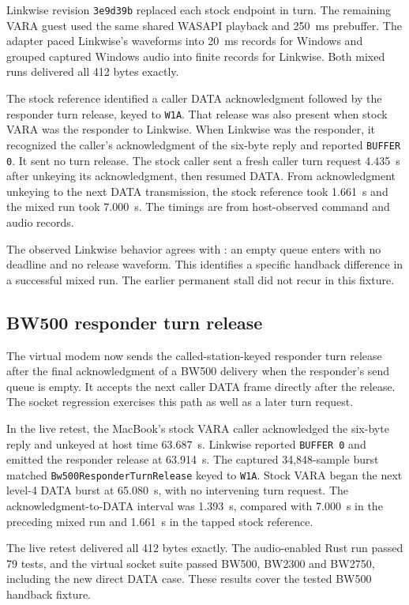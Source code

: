 \documentclass[11pt,a4paper]{article}
\newcommand{\pathtext}[1]{\path{#1}}
\begin{document}
Linkwise revision \texttt{3e9d39b} replaced each stock endpoint in
turn. The remaining VARA guest used the same shared WASAPI
playback and 250~ms prebuffer. The adapter paced Linkwise's
waveforms into 20~ms records for Windows and grouped captured
Windows audio into finite records for Linkwise. Both mixed runs
delivered all 412 bytes exactly.

The stock reference identified a caller DATA acknowledgment
followed by the responder turn release, keyed to \texttt{W1A}.
That release was also present when stock VARA was the responder
to Linkwise. When Linkwise was the responder, it recognized
the caller's acknowledgment of the six-byte reply and reported
\texttt{BUFFER 0}. It sent no turn release. The stock caller
sent a fresh caller turn request 4.435~s after unkeying its
acknowledgment, then resumed DATA. From acknowledgment unkeying
to the next DATA transmission, the stock reference took
1.661~s and the mixed run took 7.000~s. The timings are from
host-observed command and audio records.

The observed Linkwise behavior agrees with
\pathtext{acknowledge_delivery}: an empty queue enters
\pathtext{Phase::Sent} with no deadline and no release waveform.
This identifies a specific handback difference in a successful
mixed run. The earlier permanent stall did not recur in this
fixture.

\subsection{BW500 responder turn release}

The virtual modem now sends the called-station-keyed responder
turn release after the final acknowledgment of a BW500 delivery
when the responder's send queue is empty. It accepts the next
caller DATA frame directly after the release. The socket regression
exercises this path as well as a later turn request.

In the live retest, the MacBook's stock VARA caller acknowledged
the six-byte reply and unkeyed at host time 63.687~s. Linkwise
reported \texttt{BUFFER 0} and emitted the responder release at
63.914~s. The captured 34,848-sample burst matched
\texttt{Bw500ResponderTurnRelease} keyed to \texttt{W1A}. Stock
VARA began the next level-4 DATA burst at 65.080~s, with no
intervening turn request. The acknowledgment-to-DATA interval
was 1.393~s, compared with 7.000~s in the preceding mixed run
and 1.661~s in the tapped stock reference.

The live retest delivered all 412 bytes exactly. The audio-enabled
Rust run passed 79 tests, and the virtual socket suite passed
BW500, BW2300 and BW2750, including the new direct DATA case.
These results cover the tested BW500 handback fixture.
\end{document}
